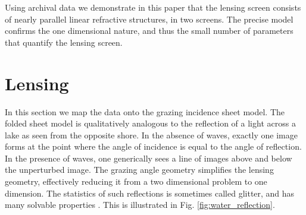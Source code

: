 \documentclass[useAMS,usenatbib]{mn2e}
\begin{document}
Using archival data we demonstrate in this paper that the lensing screen
consists of nearly parallel linear refractive structures, in two
screens.  The precise model confirms the one dimensional nature, and
thus the small number of parameters that
quantify the lensing screen. 





\section{Lensing}

In this section we map the data onto the grazing incidence sheet
model.  The folded sheet model is qualitatively analogous to the
reflection of a light across a lake as seen from the opposite
shore.
In the absence of waves, exactly one image forms at the point
where the angle of incidence is equal to the angle of reflection.  In
the presence of waves, one generically sees a line of images above and
below the unperturbed image.  The grazing angle geometry simplifies
the lensing geometry, effectively reducing it from a two dimensional problem to
one dimension.  The statistics of such reflections is sometimes called
glitter, and has many solvable
properties \citep{LonguetHiggins1960}.  This is illustrated in
Fig. \ref{fig:water_reflection}.


\end{document}
